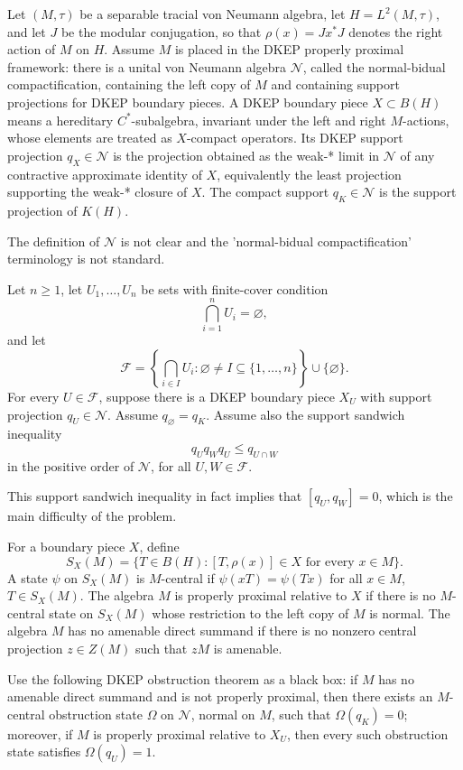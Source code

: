 \documentclass[12pt]{article}
\newcommand{\review}[1]{\begin{reviewbox}#1\end{reviewbox}}
\begin{document}
Let \((M,\tau)\) be a separable tracial von Neumann algebra, let \(H=L^2(M,\tau)\), and let \(J\) be the modular conjugation, so that \(\rho(x)=Jx^*J\) denotes the right action of \(M\) on \(H\). Assume \(M\) is placed in the DKEP properly proximal framework: there is a unital von Neumann algebra \(\mathcal N\), called the normal-bidual compactification, containing the left copy of \(M\) and containing support projections for DKEP boundary pieces. A DKEP boundary piece \(X\subset B(H)\) means a hereditary \(C^*\)-subalgebra, invariant under the left and right \(M\)-actions, whose elements are treated as \(X\)-compact operators. Its DKEP support projection \(q_X\in\mathcal N\) is the projection obtained as the weak-* limit in \(\mathcal N\) of any contractive approximate identity of \(X\), equivalently the least projection supporting the weak-* closure of \(X\). The compact support \(q_K\in\mathcal N\) is the support projection of \(K(H)\).
\review{The definition of $\mathcal N$ is not clear and the 'normal-bidual compactification' terminology is not standard.}

Let \(n\ge 1\), let \(U_1,\dots,U_n\) be sets with finite-cover condition
\[
\bigcap_{i=1}^n U_i=\varnothing,
\]
and let
\[
\mathcal F=\left\{\bigcap_{i\in I}U_i:\varnothing\ne I\subseteq\{1,\dots,n\}\right\}\cup\{\varnothing\}.
\]
For every \(U\in\mathcal F\), suppose there is a DKEP boundary piece \(X_U\) with support projection \(q_U\in\mathcal N\). Assume \(q_{\varnothing}=q_K\). Assume also the support sandwich inequality
\[
q_Uq_Wq_U\le q_{U\cap W}
\]
in the positive order of \(\mathcal N\), for all \(U,W\in\mathcal F\).
\review{This support sandwich inequality in fact implies that $[q_U,q_W]=0$, which is the main difficulty of the problem.}

For a boundary piece \(X\), define
\[
S_X(M)=\{T\in B(H):[T,\rho(x)]\in X\text{ for every }x\in M\}.
\]
A state \(\psi\) on \(S_X(M)\) is \(M\)-central if \(\psi(xT)=\psi(Tx)\) for all \(x\in M\), \(T\in S_X(M)\). The algebra \(M\) is properly proximal relative to \(X\) if there is no \(M\)-central state on \(S_X(M)\) whose restriction to the left copy of \(M\) is normal. The algebra \(M\) has no amenable direct summand if there is no nonzero central projection \(z\in Z(M)\) such that \(zM\) is amenable.

Use the following DKEP obstruction theorem as a black box: if \(M\) has no amenable direct summand and is not properly proximal, then there exists an \(M\)-central obstruction state \(\Omega\) on \(\mathcal N\), normal on \(M\), such that \(\Omega(q_K)=0\); moreover, if \(M\) is properly proximal relative to \(X_U\), then every such obstruction state satisfies \(\Omega(q_U)=1\).
\end{document}
